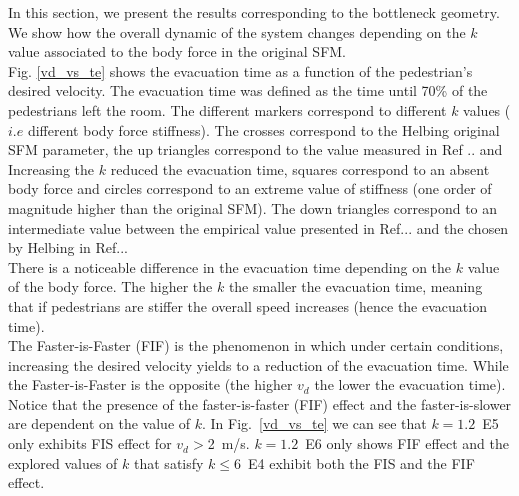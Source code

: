 \documentclass[preprint,12pt]{elsarticle}
\begin{document}
In this section, we present the results corresponding to the bottleneck geometry. We show how the overall dynamic of the system changes depending on the $k$ value associated to the body force in the original SFM.\\

Fig. \ref{vd_vs_te} shows the evacuation time as a function of the pedestrian's desired velocity. The evacuation time was defined as the time until 70\% of the pedestrians left the room. The different markers correspond to different $k$ values ($i.e$ different body force stiffness). The crosses correspond to the Helbing original SFM parameter, the up triangles correspond to the value measured in Ref .. and Increasing the $k$ reduced the evacuation time, squares correspond to an absent body force and circles correspond to an extreme value of stiffness (one order of magnitude higher than the original SFM). The down triangles correspond to an intermediate value between the empirical value presented in Ref... and the chosen by Helbing in Ref...\\

There is a noticeable difference in the evacuation time depending on the $k$ value of the body force. The higher the $k$ the smaller the evacuation time, meaning that if pedestrians are stiffer the overall speed increases (hence the evacuation time).\\

The Faster-is-Faster (FIF) is the phenomenon in which under certain conditions, increasing the desired velocity yields to a reduction of the evacuation time. While the Faster-is-Faster is the opposite (the higher $v_d$ the lower the evacuation time).  Notice that the presence of the faster-is-faster (FIF) effect and the faster-is-slower are dependent on the value of $k$. In Fig.~\ref{vd_vs_te} we can see that $k=1.2$~E5 only exhibits FIS effect for $v_d>$2~m/s. $k=1.2$~E6 only shows FIF effect and the explored values of $k$ that satisfy $k \leq 6$~E4 exhibit both the FIS and the FIF effect. \\
 
\end{document}

